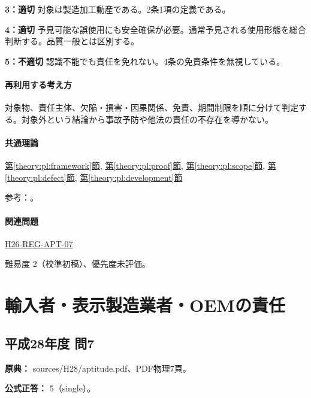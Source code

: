 \noindent\textbf{3：適切} 対象は製造加工動産である。2条1項の定義である。\par

\noindent\textbf{4：適切} 予見可能な誤使用にも安全確保が必要。通常予見される使用形態を総合判断する。品質一般とは区別する。\par

\noindent\textbf{5：不適切} 認識不能でも責任を免れない。4条の免責条件を無視している。\par

\paragraph{再利用する考え方} 対象物、責任主体、欠陥・損害・因果関係、免責、期間制限を順に分けて判定する。対象外という結論から事故予防や他法の責任の不存在を導かない。

\paragraph{共通理論} \hyperref[theory:pl:framework]{第\ref*{theory:pl:framework}節}, \hyperref[theory:pl:proof]{第\ref*{theory:pl:proof}節}, \hyperref[theory:pl:scope]{第\ref*{theory:pl:scope}節}, \hyperref[theory:pl:defect]{第\ref*{theory:pl:defect}節}, \hyperref[theory:pl:development]{第\ref*{theory:pl:development}節}

\par 参考：\cite{pl_statute,pl_qa,pl_definitions2018}。

\paragraph{関連問題} \hyperref[q:h26-reg-apt-07]{H26-REG-APT-07}

\par 難易度 2（校準初稿）、優先度未評価。

\section{輸入者・表示製造業者・OEMの責任}

\subsection{平成28年度 問7}
\label{q:h28-reg-apt-07}

\noindent\textbf{原典：} sources/H28/aptitude.pdf、PDF物理7頁。

\textbf{公式正答：} 5（single）。

